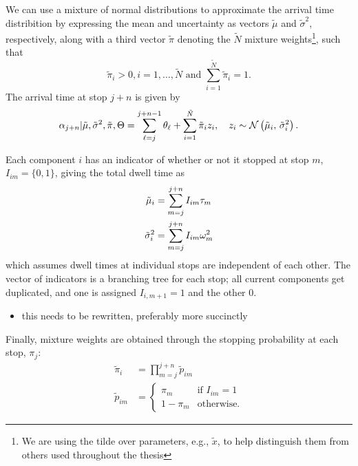 We can use a mixture of normal distributions to approximate the arrival time distribition \citep{Wang_2012} by expressing the mean and uncertainty as vectors $\tilde\mu$ and $\tilde\sigma^2$, respectively, along with a third vector $\tilde\pi$ denoting the $\tilde N$ mixture weights\footnote{We are using the tilde over parameters, e.g., $\tilde x$, to help distinguish them from others used throughout the thesis}, such that
\begin{equation}
\label{eq:ch5:mixture_weight_spec}
\tilde\pi_i > 0, i = 1, \ldots, \tilde N
\text{ and } \sum_{i=1}^{\tilde N} \tilde\pi_i = 1.
\end{equation}
The arrival time at stop $j + n$ is given by
\begin{equation}
\label{eq:arrival_time_normal_approx}
\alpha_{j+n} | \tilde\mu, \tilde\sigma^2, \tilde\pi, \Theta =
\sum_{\ell=j}^{j+n-1} \theta_\ell +
\sum_{i=1}^{\tilde N} \tilde\pi_i z_i,\quad
z_i \sim \mathcal{N}\left(\tilde\mu_i,\, \tilde\sigma^2_i\right).
\end{equation}


Each component $i$ has an indicator of whether or not it stopped at stop $m$, $I_{im} = \{0,1\}$, giving the total dwell time as
\begin{equation}
\label{eq:mixture_dwell_times}
\begin{split}
\tilde\mu_i &= \sum_{m=j}^{j+n} I_{im} \tau_m \\
\tilde\sigma_i^2 &= \sum_{m=j}^{j+n} I_{im} \omega^2_m
\end{split}
\end{equation}
which assumes dwell times at individual stops are independent of each other. The vector of indicators is a branching tree for each stop; all current components get duplicated, and one is assigned $I_{i,m+1} = 1$ and the other 0.

\begin{itemize}
\item this needs to be rewritten, preferably more succinctly
\end{itemize}


Finally, mixture weights are obtained through the stopping probability at each stop, $\pi_j$:
\begin{equation}
\label{eq:ch5:mixture_weights}
\begin{split}
\tilde\pi_i &= \prod_{m=j}^{j+n} \tilde p_{im} \\
\tilde p_{im} &=
\begin{cases}
\pi_m & \text{if } I_{im} = 1 \\
1 - \pi_m & \text{otherwise.}
\end{cases}
\end{split}
\end{equation}


